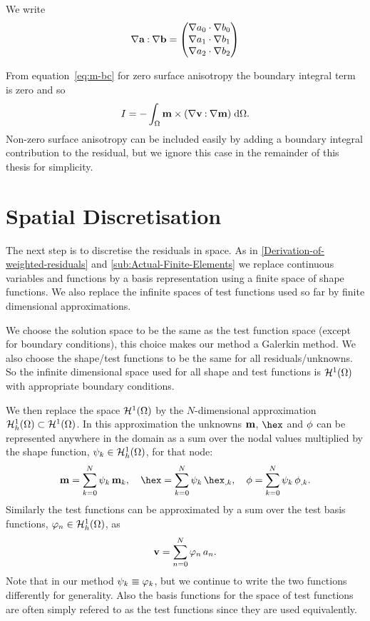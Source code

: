 We write 
\begin{equation} 
  \nabla {\mathbf{a}} \mathbin{:} \nabla  {\mathbf{b}}
  =\begin{pmatrix} \nabla a_0 \cdot \nabla  b_0 \\ \nabla a_1 \cdot \nabla b_1 \\ \nabla a_2 \cdot \nabla b_2 \end{pmatrix}
\end{equation}

From equation~\eqref{eq:m-bc} for zero surface anisotropy the boundary integral term is zero and so
\begin{equation}
  I = - \int_\Omega  \mathbf{m} \times {\left( \nabla\mathbf{v}\mathbin{:}\nabla\mathbf{m}\right)} {\; \text{d}}\Omega.
\end{equation}
Non-zero surface anisotropy can be included easily by adding a boundary integral contribution to the residual, but we ignore this case in the remainder of this thesis for simplicity.


\section{Spatial Discretisation}
\label{sec:spat-discr-resi}

The next step is to discretise the residuals in space. As in \autoref{Derivation-of-weighted-residuals} and \ref{sub:Actual-Finite-Elements} we replace continuous variables and functions by a basis representation using a finite space of shape functions. We also replace the infinite spaces of test functions used so far by finite dimensional approximations.

We choose the solution space to be the same as the test function space (except for boundary conditions), this choice makes our method a Galerkin method. We also choose the shape/test functions to be the same for all residuals/unknowns. So the infinite dimensional space used for all shape and test functions is $\mathcal{H}^1(\Omega)$ with appropriate boundary conditions.

We then replace the space $\mathcal{H}^1(\Omega)$ by the $N$-dimensional approximation ${\mathcal{H}^1_h(\Omega)} \subset \mathcal{H}^1(\Omega)$. In this approximation the unknowns $\mathbf{m}$, $\hex$ and $\phi$ can be represented anywhere in the domain as a sum over the nodal values multiplied by the shape function, ${\psi_k} \in {\mathcal{H}^1_h(\Omega)}$, for that node:
\begin{gather} %
  \mv = \sum_{k = 0}^{N} \sk \, \mv_k, \quad
  \hex = \sum_{k = 0}^{N} \sk \, \hex_{,k}, \quad
  \phim = \sum_{k = 0}^{N} \sk \, \phim_{,k}.
  \label{eq:unknowns-basis}
\end{gather}
Similarly the test functions can be approximated by a sum over the test basis functions, ${\varphi_n} \in {\mathcal{H}^1_h(\Omega)}$, as
\begin{equation}
  \label{eq:47}
  \mathbf{v} = \sum_{n = 0}^{N} {\varphi_n} \, a_n.
\end{equation}
Note that in our method $\psi_k \equiv \varphi_k$, but we continue to write the two functions differently for generality. Also the basis functions for the space of test functions are often simply refered to as the test functions since they are used equivalently.

